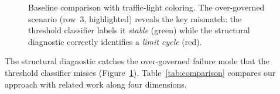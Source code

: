 \documentclass[sigconf,nonacm]{acmart}
\begin{document}
\begin{figure}[t]
  \centering
  \caption{Baseline comparison with traffic-light coloring. The
    over-governed scenario (row~3, highlighted) reveals the key mismatch:
    the threshold classifier labels it \emph{stable} (green) while the
    structural diagnostic correctly identifies a \emph{limit cycle} (red).}
  \label{fig:baseline}
\end{figure}

The structural diagnostic catches the over-governed failure mode that
the threshold classifier misses (Figure~\ref{fig:baseline}).
Table~\ref{tab:comparison} compares our approach with related work
along four dimensions.
\end{document}
